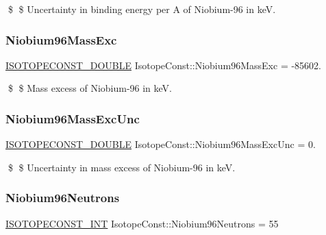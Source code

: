 \$ \$ Uncertainty in binding energy per A of Niobium-\/96 in keV. \mbox{\label{group___isotope_const-_niobium-_nb96_ga81d5b284fb4ebb20f6dc575eb6eec8d6}} 
\subsubsection{\texorpdfstring{Niobium96\+Mass\+Exc}{Niobium96MassExc}}
{\footnotesize\ttfamily \mbox{\hyperlink{group___isotope_const-_macros_ga8f45a7272ce02c0b4c65c44636ed719a}{I\+S\+O\+T\+O\+P\+E\+C\+O\+N\+S\+T\+\_\+\+D\+O\+U\+B\+LE}} Isotope\+Const\+::\+Niobium96\+Mass\+Exc = -\/85602.}

\$ \$ Mass excess of Niobium-\/96 in keV. \mbox{\label{group___isotope_const-_niobium-_nb96_gadbb599b8ad1b5a642f1a2b8741772e8e}} 
\subsubsection{\texorpdfstring{Niobium96\+Mass\+Exc\+Unc}{Niobium96MassExcUnc}}
{\footnotesize\ttfamily \mbox{\hyperlink{group___isotope_const-_macros_ga8f45a7272ce02c0b4c65c44636ed719a}{I\+S\+O\+T\+O\+P\+E\+C\+O\+N\+S\+T\+\_\+\+D\+O\+U\+B\+LE}} Isotope\+Const\+::\+Niobium96\+Mass\+Exc\+Unc = 0.}

\$ \$ Uncertainty in mass excess of Niobium-\/96 in keV. \mbox{\label{group___isotope_const-_niobium-_nb96_gaaac42f7e8cfb831f7b182e6a4121a976}} 
\subsubsection{\texorpdfstring{Niobium96\+Neutrons}{Niobium96Neutrons}}
{\footnotesize\ttfamily \mbox{\hyperlink{group___isotope_const-_macros_ga5f18360b3e99483a35c32d789e62621c}{I\+S\+O\+T\+O\+P\+E\+C\+O\+N\+S\+T\+\_\+\+I\+NT}} Isotope\+Const\+::\+Niobium96\+Neutrons = 55}

